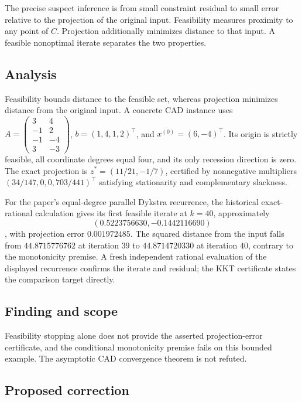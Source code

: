 \documentclass[11pt]{article}
\begin{document}
The precise suspect inference is from small constraint residual to small error relative to the projection of the original input. Feasibility measures proximity to any point of \(C\). Projection additionally minimizes distance to that input. A feasible nonoptimal iterate separates the two properties.

\subsection*{Analysis}

Feasibility bounds distance to the feasible set, whereas projection minimizes distance from the original input. A concrete CAD instance uses \(A=\begin{pmatrix}3&4\\-1&2\\-1&-4\\3&-3\end{pmatrix}\), \(b=(1,4,1,2)^\top\), and \(x^{(0)}=(6,-4)^\top\). Its origin is strictly feasible, all coordinate degrees equal four, and its only recession direction is zero. The exact projection is \(z^*=(11/21,-1/7)\), certified by nonnegative multipliers \((34/147,0,0,703/441)^\top\) satisfying stationarity and complementary slackness.

For the paper's equal-degree parallel Dykstra recurrence, the historical exact-rational calculation gives its first feasible iterate at \(k=40\), approximately \[(0.5223756630,-0.1442116690)\], with projection error \(0.001972485\). The squared distance from the input falls from \(44.8715776762\) at iteration \(39\) to \(44.8714720330\) at iteration \(40\), contrary to the monotonicity premise. A fresh independent rational evaluation of the displayed recurrence confirms the iterate and residual; the KKT certificate states the comparison target directly.

\subsection*{Finding and scope}

Feasibility stopping alone does not provide the asserted projection-error certificate, and the conditional monotonicity premise fails on this bounded example. The asymptotic CAD convergence theorem is not refuted.

\subsection*{Proposed correction}
\end{document}
